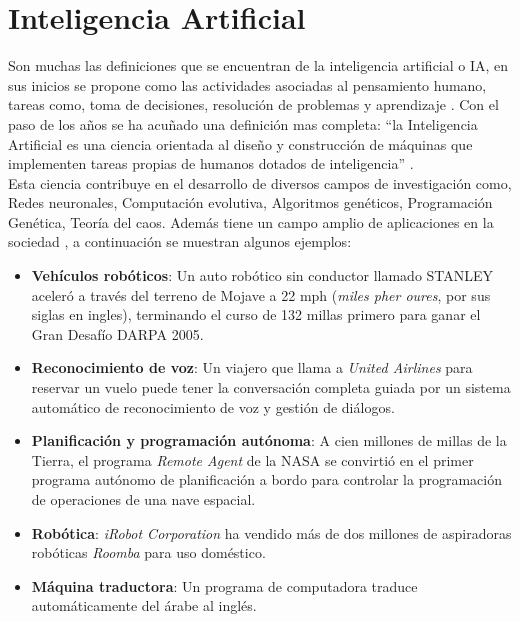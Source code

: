 

\section{Inteligencia Artificial}

Son muchas las definiciones que se encuentran de la inteligencia artificial o IA, en sus inicios se propone como las  actividades asociadas al pensamiento humano, tareas como, toma de decisiones, resolución de problemas y aprendizaje \citep{CT19}. Con el paso de los años se ha acuñado una definición mas completa: ``la Inteligencia Artificial es una ciencia orientada al diseño y construcción de máquinas que implementen tareas propias de humanos dotados de inteligencia'' \citep{CT1}.\\


Esta ciencia contribuye en el desarrollo de diversos campos de investigación como, Redes neuronales, Computación evolutiva, Algoritmos genéticos, Programación Genética, Teoría del caos. Además tiene un campo amplio de aplicaciones en la sociedad \citep{CT20}, a continuación se muestran algunos ejemplos:

\begin{itemize}

	\item \textbf{Vehículos robóticos}: Un auto robótico sin conductor llamado STANLEY aceleró a través del terreno de Mojave a 22 mph (\textit{miles pher oures}, por sus siglas en ingles), terminando el curso de 132 millas primero para ganar el Gran Desafío DARPA 2005.

	\item \textbf{Reconocimiento de voz}: Un viajero que llama a \textit{United Airlines} para reservar un vuelo puede tener la conversación completa guiada por un sistema automático de reconocimiento de voz y gestión de diálogos.

	\item \textbf{Planificación y programación autónoma}: A cien millones de millas de la Tierra, el programa \textit{Remote Agent} de la NASA se convirtió en el primer programa autónomo de planificación a bordo para controlar la programación de operaciones de una nave espacial.

	\item \textbf{Robótica}: \textit{iRobot Corporation} ha vendido más de dos millones de aspiradoras robóticas \textit{Roomba} para uso doméstico.

	\item \textbf{Máquina traductora}: Un programa de computadora  traduce automáticamente del árabe al inglés.

\end{itemize} 

